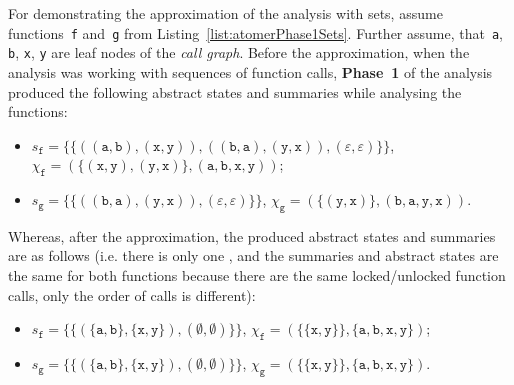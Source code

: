 \begin{example}
    For demonstrating the approximation of the analysis with sets,
    assume functions~\texttt{f} and~\texttt{g} from
    Listing~\ref{list:atomerPhase1Sets}. Further assume,
    that~\texttt{a}, \texttt{b}, \texttt{x}, \texttt{y} are leaf
    nodes of the \emph{call graph}. Before the approximation,
    when the analysis was working with sequences of function calls,
    \textbf{Phase~1} of the analysis produced the following
    abstract states and summaries while analysing the functions:
    \begin{itemize}
        \item 
            $ s_\mathtt{f} = \{\{({(\mathtt{a}, \mathtt{b})}, {(\mathtt{x},
            \mathtt{y})}), ({(\mathtt{b}, \mathtt{a})}, {(\mathtt{y},
            \mathtt{x})}), {(\varepsilon, \varepsilon)}\}\} $,
            $ \chi_\mathtt{f} = (\{{(\mathtt{x}, \mathtt{y})},
            {(\mathtt{y}, \mathtt{x})}\}, (\mathtt{a}, \mathtt{b},
            \mathtt{x}, \mathtt{y})) $;
            
        \item
            $ s_\mathtt{g} = \{\{({(\mathtt{b}, \mathtt{a})},
            {(\mathtt{y}, \mathtt{x})}), {(\varepsilon,
            \varepsilon)}\}\} $, $ \chi_\mathtt{g} = (\{{(\mathtt{y},
            \mathtt{x})}\}, {(\mathtt{b}, \mathtt{a}, \mathtt{y},
            \mathtt{x})}) $.
    \end{itemize}
    Whereas, after the approximation, the produced abstract states
    and summaries are as follows (i.e. there is only one ,
    and the summaries and abstract states are the same for both functions
    because there are the same locked/unlocked function calls, only the
    order of calls is different):
    \begin{itemize}
        \item 
            $ s_\mathtt{f} = \{\{({\{\mathtt{a}, \mathtt{b}\}},
            {\{\mathtt{x}, \mathtt{y}\}}), {(\emptyset, \emptyset)}\}\} $,
            $ \chi_\mathtt{f} = ({\{\{\mathtt{x}, \mathtt{y}\}\}},
            {\{\mathtt{a}, \mathtt{b}, \mathtt{x}, \mathtt{y}\}}) $;
            
        \item
            $ s_\mathtt{g} = \{\{({\{\mathtt{a}, \mathtt{b}\}},
            {\{\mathtt{x}, \mathtt{y}\}}), {(\emptyset, \emptyset)}\}\} $,
            $ \chi_\mathtt{g} = ({\{\{\mathtt{x}, \mathtt{y}\}\}},
            {\{\mathtt{a}, \mathtt{b}, \mathtt{x}, \mathtt{y}\}}) $.
    \end{itemize}
\end{example}

